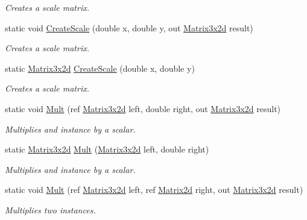 \begin{DoxyCompactItemize}
\begin{DoxyCompactList}\small\item\em Creates a scale matrix. \end{DoxyCompactList}\item 
static void \hyperlink{struct_open_t_k_1_1_matrix3x2d_a88617518914cebc996cc13f9b59bd2d0}{Create\-Scale} (double x, double y, out \hyperlink{struct_open_t_k_1_1_matrix3x2d}{Matrix3x2d} result)
\begin{DoxyCompactList}\small\item\em Creates a scale matrix. \end{DoxyCompactList}\item 
static \hyperlink{struct_open_t_k_1_1_matrix3x2d}{Matrix3x2d} \hyperlink{struct_open_t_k_1_1_matrix3x2d_a7ea663882e2edc4066bb6f0f580fae5a}{Create\-Scale} (double x, double y)
\begin{DoxyCompactList}\small\item\em Creates a scale matrix. \end{DoxyCompactList}\item 
static void \hyperlink{struct_open_t_k_1_1_matrix3x2d_a25238b672e5139c431ef8ae64d12d704}{Mult} (ref \hyperlink{struct_open_t_k_1_1_matrix3x2d}{Matrix3x2d} left, double right, out \hyperlink{struct_open_t_k_1_1_matrix3x2d}{Matrix3x2d} result)
\begin{DoxyCompactList}\small\item\em Multiplies and instance by a scalar. \end{DoxyCompactList}\item 
static \hyperlink{struct_open_t_k_1_1_matrix3x2d}{Matrix3x2d} \hyperlink{struct_open_t_k_1_1_matrix3x2d_a7540e76c42b90c6d99ec04958def4e38}{Mult} (\hyperlink{struct_open_t_k_1_1_matrix3x2d}{Matrix3x2d} left, double right)
\begin{DoxyCompactList}\small\item\em Multiplies and instance by a scalar. \end{DoxyCompactList}\item 
static void \hyperlink{struct_open_t_k_1_1_matrix3x2d_a2787216b94157692d262e94798843fd8}{Mult} (ref \hyperlink{struct_open_t_k_1_1_matrix3x2d}{Matrix3x2d} left, ref \hyperlink{struct_open_t_k_1_1_matrix2d}{Matrix2d} right, out \hyperlink{struct_open_t_k_1_1_matrix3x2d}{Matrix3x2d} result)
\begin{DoxyCompactList}\small\item\em Multiplies two instances. \end{DoxyCompactList}\item 

\end{DoxyCompactItemize}
